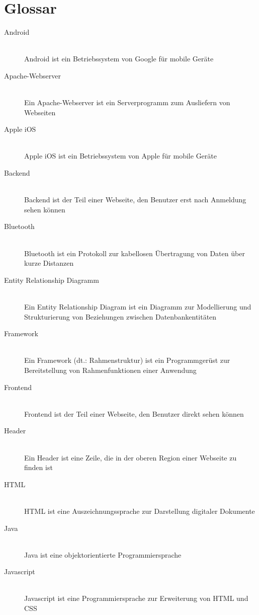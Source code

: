 \chapter*{Glossar}\label{Glossar}
\begin{description}
  \item[Android] \hfill \\
    Android ist ein Betriebssystem von Google für mobile Geräte
  \item[Apache-Webserver] \hfill \\
    Ein Apache-Webserver ist ein Serverprogramm zum Ausliefern von Webseiten
  \item[Apple iOS] \hfill \\
    Apple iOS ist ein Betriebssystem von Apple für mobile Geräte
  \item[Backend] \hfill \\
    Backend ist der Teil einer Webseite, den Benutzer erst nach Anmeldung sehen können
  \item[Bluetooth] \hfill \\
    Bluetooth ist ein Protokoll zur kabellosen Übertragung von Daten über kurze Distanzen
  \item[Entity Relationship Diagramm] \hfill \\
    Ein Entity Relationship Diagram ist ein Diagramm zur Modellierung und Strukturierung von Beziehungen zwischen Datenbankentitäten
  \item[Framework] \hfill \\
    Ein Framework (dt.: Rahmenstruktur) ist ein Programmgerüst zur Bereitstellung von Rahmenfunktionen einer Anwendung
  \item[Frontend] \hfill \\
    Frontend ist der Teil einer Webseite, den Benutzer direkt sehen können
  \item[Header] \hfill \\
    Ein Header ist eine Zeile, die in der oberen Region einer Webseite zu finden ist
  \item[HTML] \hfill \\
    HTML ist eine Auszeichnungssprache zur Darstellung digitaler Dokumente
  \item[Java] \hfill \\
    Java ist eine objektorientierte Programmiersprache
  \item[Javascript] \hfill \\
    Javascript ist eine Programmiersprache zur Erweiterung von HTML und CSS

\end{description}

